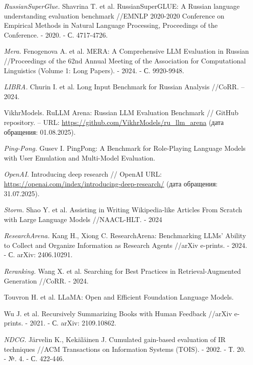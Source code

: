 \documentclass{article}
\begin{document}
\begin{thebibliography}{99}

\textit{RussianSuperGlue.}
Shavrina T. et al. RussianSuperGLUE: A Russian language understanding evaluation benchmark //EMNLP 2020-2020 Conference on Empirical Methods in Natural Language Processing, Proceedings of the Conference. - 2020. - С. 4717-4726.

\textit{Mera.}
Fenogenova A. et al. MERA: A Comprehensive LLM Evaluation in Russian //Proceedings of the 62nd Annual Meeting of the Association for Computational Linguistics (Volume 1: Long Papers). - 2024. - С. 9920-9948.

\textit{LIBRA.}
Churin I. et al. Long Input Benchmark for Russian Analysis //CoRR. – 2024.

VikhrModels. RuLLM Arena: Russian LLM Evaluation Benchmark // GitHub repository. – URL: \url{https://github.com/VikhrModels/ru_llm_arena} (дата обращения: 01.08.2025).

\textit{Ping-Pong.}
Gusev I. PingPong: A Benchmark for Role-Playing Language Models with User Emulation and Multi-Model Evaluation.

\textit{OpenAI.}
Introducing deep research // OpenAI URL: \url{https://openai.com/index/introducing-deep-research/} (дата обращения: 31.07.2025).

\textit{Storm.}
Shao Y. et al. Assisting in Writing Wikipedia-like Articles From Scratch with Large Language Models //NAACL-HLT. - 2024

\textit{ResearchArena.}
Kang H., Xiong C. ResearchArena: Benchmarking LLMs' Ability to Collect and Organize Information as Research Agents //arXiv e-prints. - 2024. - С. arXiv: 2406.10291.

\textit{Reranking.}
Wang X. et al. Searching for Best Practices in Retrieval-Augmented Generation //CoRR. - 2024.

Touvron H. et al. LLaMA: Open and Efficient Foundation Language Models.

Wu J. et al. Recursively Summarizing Books with Human Feedback //arXiv e-prints. - 2021. - С. arXiv: 2109.10862.

\textit{NDCG.}
Järvelin K., Kekäläinen J. Cumulated gain-based evaluation of IR techniques //ACM Transactions on Information Systems (TOIS). - 2002. - Т. 20. - №. 4. - С. 422-446.


\end{thebibliography}
\end{document}
